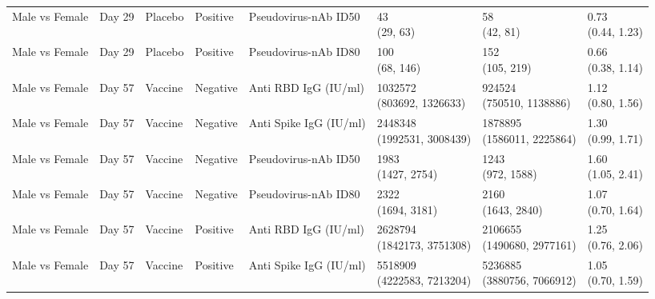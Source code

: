 \documentclass[]{book}
\theoremstyle{definition}
\theoremstyle{definition}
\theoremstyle{definition}
\newcommand{\1}{\mathbbm{1}}
\begin{document}
\begin{landscape}
\begin{ThreePartTable}
\begin{longtable}[t]{>{\raggedright\arraybackslash}p{2.7cm}lllllll}
Male vs Female & Day 29 & Placebo & Positive & Pseudovirus-nAb ID50 & \makecell[l]{43\\(29, 63)} & \makecell[l]{58\\(42, 81)} & \makecell[l]{0.73\\(0.44, 1.23)}\\
Male vs Female & Day 29 & Placebo & Positive & Pseudovirus-nAb ID80 & \makecell[l]{100\\(68, 146)} & \makecell[l]{152\\(105, 219)} & \makecell[l]{0.66\\(0.38, 1.14)}\\
Male vs Female & Day 57 & Vaccine & Negative & Anti RBD IgG (IU/ml) & \makecell[l]{1032572\\(803692, 1326633)} & \makecell[l]{924524\\(750510, 1138886)} & \makecell[l]{1.12\\(0.80, 1.56)}\\
\addlinespace
Male vs Female & Day 57 & Vaccine & Negative & Anti Spike IgG (IU/ml) & \makecell[l]{2448348\\(1992531, 3008439)} & \makecell[l]{1878895\\(1586011, 2225864)} & \makecell[l]{1.30\\(0.99, 1.71)}\\
Male vs Female & Day 57 & Vaccine & Negative & Pseudovirus-nAb ID50 & \makecell[l]{1983\\(1427, 2754)} & \makecell[l]{1243\\(972, 1588)} & \makecell[l]{1.60\\(1.05, 2.41)}\\
Male vs Female & Day 57 & Vaccine & Negative & Pseudovirus-nAb ID80 & \makecell[l]{2322\\(1694, 3181)} & \makecell[l]{2160\\(1643, 2840)} & \makecell[l]{1.07\\(0.70, 1.64)}\\
Male vs Female & Day 57 & Vaccine & Positive & Anti RBD IgG (IU/ml) & \makecell[l]{2628794\\(1842173, 3751308)} & \makecell[l]{2106655\\(1490680, 2977161)} & \makecell[l]{1.25\\(0.76, 2.06)}\\
Male vs Female & Day 57 & Vaccine & Positive & Anti Spike IgG (IU/ml) & \makecell[l]{5518909\\(4222583, 7213204)} & \makecell[l]{5236885\\(3880756, 7066912)} & \makecell[l]{1.05\\(0.70, 1.59)}\\

\end{longtable}
\end{ThreePartTable}
\end{landscape}
\end{document}
